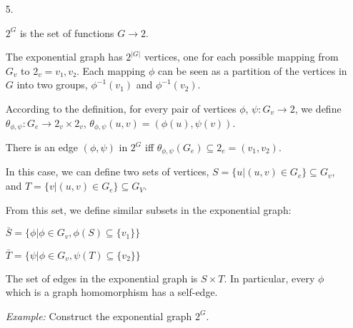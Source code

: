 \documentclass[a4paper,notitlepage]{article}
\begin{document}
\begin{enumerate}
\begin{enumerate}
\begin{proof}
\begin{description}
        Universality of ($(A^B)^C$)
        $$\overline{\overline{f \circ \iota}} = z = z^\prime$$

     \end{description}

     \end{proof}

   \end{enumerate}

   \item[ 5.]

     $2^G$ is the set of functions $G → 2$.

     The exponential graph has $2^{\vert G \vert }$ vertices, one for each
     possible mapping from $G_v$ to $2_v = {v₁,v₂}$. Each mapping $\phi$ can be
     seen as a partition of the vertices in $G$ into two groups, $\phi^{-1}(v_1)$
     and $\phi^{-1}(v_2)$.

     According to the definition, for every pair of vertices $\phi$,
     $\psi : G_v → 2$, we define
     $\theta_{\phi,\psi} : G_e → 2_v \times 2_v$,
     $\theta_{\phi,\psi}(u,v) = (\phi(u), \psi(v))$.

     There is an edge $(\phi, \psi)$ in $2^G$ iff $\theta_{\phi,\psi}(G_e) \subseteq 2_e = {(v_1,v_2)}$.

     In this case, we can define two sets of vertices, $S = \{ u \vert (u,v) \in G_e \} \subseteq G_v$, and
     $T = \{ v \vert (u,v) \in G_e \} \subseteq G_V$.

     From this set, we define similar subsets in the exponential graph:

     $\bar{S} = \{ \phi \vert \phi \in G_v, \phi(S) \subseteq \{ v_1 \} \}$

     $\bar{T} = \{ \psi \vert \phi \in G_v, \psi(T) \subseteq \{ v_2 \} \}$

     The set of edges in the exponential graph is $S \times T$. In particular,
     every $\phi$ which is a graph homomorphism has a self-edge.

     {\em Example:} Construct the exponential graph $2^G$. 
     
     \begin{multicols}{2}
     
     \begin{dot2tex}[neato]
       
     \end{dot2tex}
     
     \begin{dot2tex}[neato]
       
     \end{dot2tex}


\end{multicols}
\end{enumerate}
\end{document}
